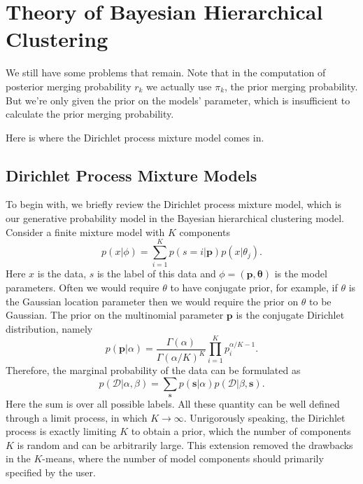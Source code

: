\section{Theory of Bayesian Hierarchical Clustering}

We still have some problems that remain. Note that in the computation of posterior merging probability $r_k$ we actually use $\pi_k$, the prior merging probability. But we're only given the prior on the models' parameter, which is insufficient to calculate the prior merging probability. 

Here is where the Dirichlet process mixture model comes in. 

\subsection{Dirichlet Process Mixture Models}

To begin with, we briefly review the Dirichlet process mixture model, which is our generative probability model in the Bayesian hierarchical clustering model. Consider a finite mixture model with $K$ components
\begin{equation*}
    p(x|\phi)=\sum_{i=1}^K p(s=i|\mathbf{p})p(x|\theta_j).
\end{equation*}
Here $x$ is the data, $s$ is the label of this data and $\phi=(\mathbf{p}, \mathbf{\theta})$ is the model parameters. Often we would require $\theta$ to have conjugate prior, for example, if $\theta$ is the Gaussian location parameter then we would require the prior on $\theta$ to be Gaussian. The prior on the multinomial parameter $\mathbf{p}$ is the conjugate Dirichlet distribution, namely
\begin{equation*}
    p(\mathbf{p}|\alpha)=\frac{\Gamma(\alpha)}{\Gamma(\alpha/K)^K} \prod_{i=1}^K p_i^{\alpha/K -1}.
\end{equation*}
Therefore, the marginal probability of the data can be formulated as
\begin{equation*}
    p(\mathcal{D}|\alpha,\beta)=\sum_{\mathbf{s}} p(\mathbf{s}|\alpha) p(\mathcal{D}|\beta, \mathbf{s}).
\end{equation*}
Here the sum is over all possible labels. All these quantity can be well defined through a limit process, in which $K\to \infty$. Unrigorously speaking, the Dirichlet process is exactly limiting $K$ to obtain a prior, which the number of components $K$ is random and can be arbitrarily large. This extension removed the drawbacks in the $K$-means, where the number of model components should primarily specified by the user.

